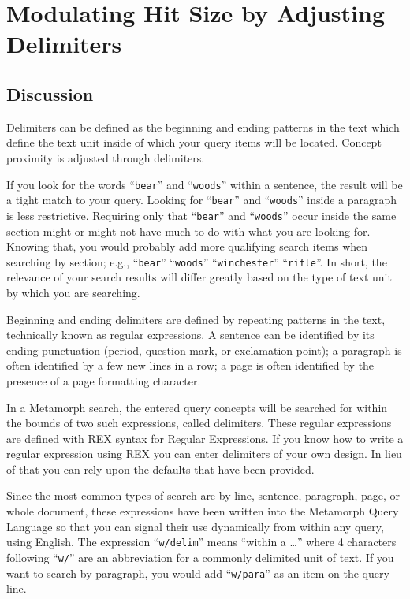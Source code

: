 \section{Modulating Hit Size by Adjusting Delimiters}

\subsection{Discussion}

Delimiters can be defined as the beginning and ending patterns in the
text which define the text unit inside of which your query items will
be located.  Concept proximity is adjusted through delimiters.

If you look for the words ``\verb`bear`'' and ``\verb`woods`'' within
a sentence, the result will be a tight match to your query.  Looking
for ``\verb`bear`'' and ``\verb`woods`'' inside a paragraph is less
restrictive.  Requiring only that ``\verb`bear`'' and ``\verb`woods`''
occur inside the same section might or might not have much to do with
what you are looking for.  Knowing that, you would probably add more
qualifying search items when searching by section; e.g.,
``\verb`bear`'' ``\verb`woods`'' ``\verb`winchester`''
``\verb`rifle`''.  In short, the relevance of your search results will
differ greatly based on the type of text unit by which you are
searching.

Beginning and ending delimiters are defined by repeating patterns in
the text, technically known as regular expressions.  A sentence can be
identified by its ending punctuation (period, question mark, or
exclamation point); a paragraph is often identified by a few new lines
in a row; a page is often identified by the presence of a page
formatting character.

In a Metamorph search, the entered query concepts will be searched for
within the bounds of two such expressions, called delimiters.  These
regular expressions are defined with REX syntax for Regular
Expressions.  If you know how to write a regular expression using
REX you can enter delimiters of your own design.  In lieu of
that you can rely upon the defaults that have been provided.

Since the most common types of search are by line, sentence,
paragraph, page, or whole document, these expressions have been
written into the Metamorph Query Language so that you can signal their
use dynamically from within any query, using English.  The expression
``\verb`w/delim`'' means ``within a \ldots'' where 4 characters
following ``\verb`w/`'' are an abbreviation for a commonly delimited
unit of text.  If you want to search by paragraph, you would add
``\verb`w/para`'' as an item on the query line.

